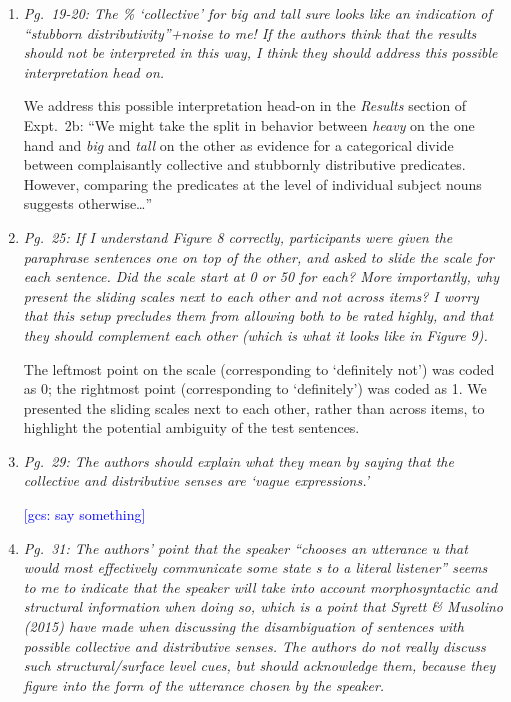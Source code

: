 \documentclass[12pt]{article}
\newcommand{\gcs}[1]{\textcolor{blue}{[gcs: #1]}}
\begin{document}
\begin{enumerate}
\item \emph{Pg.~19-20: The \% `collective' for \emph{big} and \emph{tall} sure looks like an indication of ``stubborn distributivity''+noise to me! If the authors think that the results should not be interpreted in this way, I think they should address this possible interpretation head on.}

We address this possible interpretation head-on in the \emph{Results} section of Expt.~2b: ``We might take the split in behavior between \emph{heavy} on the one hand and \emph{big} and \emph{tall} on the other as evidence for a categorical divide between complaisantly collective and stubbornly distributive predicates. However, comparing the predicates at the level of individual subject nouns suggests otherwise\ldots''

\item \emph{Pg.~25: If I understand Figure 8 correctly, participants were given the paraphrase sentences one on top of the other, and asked to slide the scale for each sentence. Did the scale start at 0 or 50 for each? More importantly, why present the sliding scales next to each other and not across items? I worry that this setup precludes them from allowing both to be rated highly, and that they should complement each other (which is what it looks like in Figure 9).}

The leftmost point on the scale (corresponding to `definitely not') was coded as 0; the rightmost point (corresponding to `definitely') was coded as 1. We presented the sliding scales next to each other, rather than across items, to highlight the potential ambiguity of the test sentences.

\item \emph{Pg.~29: The authors should explain what they mean by saying that the collective and distributive senses are `vague expressions.'}

\gcs{say something}

\item \emph{Pg.~31: The authors' point that the speaker ``chooses an utterance u that would most effectively communicate some state s to a literal listener'' seems to me to indicate that the speaker will take
into account morphosyntactic and structural information when doing so, which is a point that Syrett \& Musolino (2015) have made when discussing the disambiguation of sentences with possible collective and distributive senses. The authors do not really discuss such structural/surface level cues, but should acknowledge them, because they figure into the form of the utterance chosen by the speaker.}


\end{enumerate}
\end{document}

